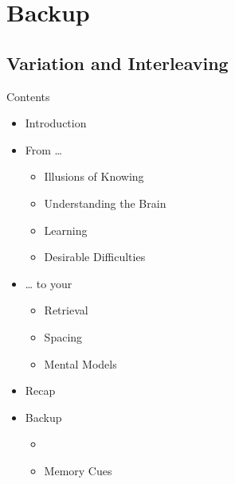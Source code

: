 \documentclass{ercisbeamer}
\begin{document}

\sources

\section{Backup}
\subsection{Variation and Interleaving}
\begin{frame}{Contents}
    \begin{itemize}
        \item Introduction
        \item From …
        \begin{itemize}
            \item Illusions of Knowing
            \item Understanding the Brain
            \item Learning
            \item Desirable Difficulties
        \end{itemize}
        \item … to your 
        \begin{itemize}
            \item Retrieval
            \item Spacing
            \item Mental Models
        \end{itemize}
        \item Recap
        \item Backup
        \begin{itemize}
            \item {}
            \item Memory Cues
        \end{itemize}
    \end{itemize}
\end{frame}
\end{document}
